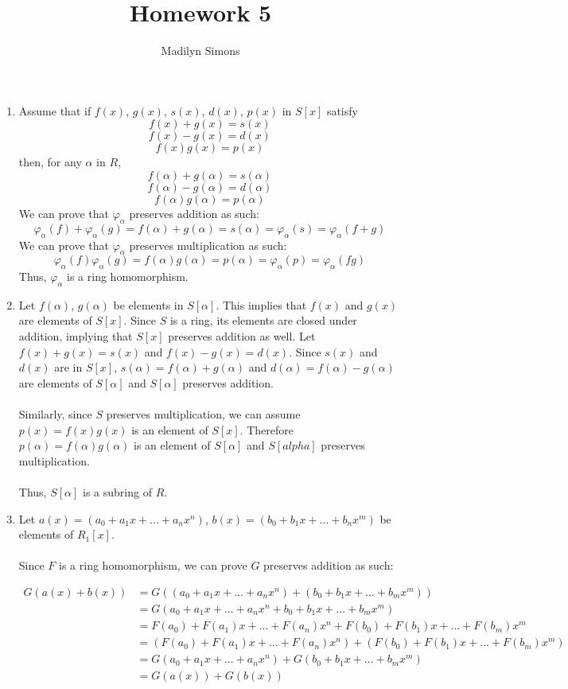 \documentclass{article}
\title{Homework 5}
\author{Madilyn Simons}
\date{}
\begin{document}
\maketitle

\begin{enumerate}

\item Assume that if $f(x)$, $g(x)$, $s(x)$, $d(x)$, $p(x)$ in $S[x]$ satisfy
\[
f(x) + g(x) = s(x)
\] \[
f(x) - g(x) = d(x)
\] \[
f(x)g(x) = p(x)
\]
then, for any $\alpha$ in $R$,
\[
\] \[
f(\alpha) + g(\alpha) = s(\alpha)
\] \[
f(\alpha) - g(\alpha) = d(\alpha)
\] \[
f(\alpha)g(\alpha) = p(\alpha)
\]
We can prove that $\varphi_{\alpha}$ preserves addition as such:
\[
\varphi_{\alpha}(f) + \varphi_{\alpha}(g) = f(\alpha) + g(\alpha) = s(\alpha) = \varphi_{\alpha}(s) = \varphi_{\alpha}(f+g)
\]
We can prove that $\varphi_{\alpha}$ preserves multiplication as such:
\[
\varphi_{\alpha}(f)\varphi_{\alpha}(g) = f(\alpha)g(\alpha) = p(\alpha) = \varphi_{\alpha}(p) = \varphi_{\alpha}(fg)
\]
Thus, $\varphi_{\alpha}$ is a ring homomorphism.

\item Let $f(\alpha)$, $g(\alpha)$ be elements in $S[\alpha]$.  This implies
that $f(x)$ and $g(x)$ are elements of $S[x]$.  Since $S$ is a ring, its
elements are closed under addition, implying that $S[x]$ preserves
addition as well.  Let $f(x) + g(x) = s(x)$ and $f(x) - g(x) = d(x)$.  Since
$s(x)$ and $d(x)$ are in $S[x]$, $s(\alpha) = f(\alpha) + g(\alpha)$ and
$d(\alpha) = f(\alpha) - g(\alpha)$ are elements of $S[\alpha]$ and $S[\alpha]$
preserves addition.
\\
\\
Similarly, since $S$ preserves multiplication, we can assume $p(x) = f(x)g(x)$
is an element of $S[x]$.  Therefore $p(\alpha) = f(\alpha)g(\alpha)$ is an
element of $S[\alpha]$ and $S[alpha]$ preserves multiplication.
\\
\\
Thus, $S[\alpha]$ is a subring of $R$.




\item Let $a(x) = (a_0 + a_{1}x + ... + a_{n}x^n)$, $b(x) = (b_0 + b_{1}x + ... + b_{n}x^m)$
be elements of $R_{1}[x]$.
\\ \\
Since $F$ is a ring homomorphism, we can prove $G$ preserves addition as such:

\begin{align*}
G(a(x) + b(x)) &= G((a_0 + a_{1}x + ... + a_{n}x^{n}) + (b_0 + b_{1}x + ... + b_{m}x^{m})) \\
&= G(a_0 + a_{1}x + ... + a_{n}x^n + b_0 + b_{1}x + ... + b_{m}x^{m}) \\
&= F(a_{0}) + F(a_{1})x + ... + F(a_{n})x^{n} + F(b_{0}) + F(b_{1})x + ... + F(b_{m})x^{m} \\
&= (F(a_{0}) + F(a_{1})x + ... + F(a_{n})x^{n}) + (F(b_{0}) + F(b_{1})x + ... + F(b_{m})x^{m}) \\
&= G(a_0 + a_{1}x + ... + a_{n}x^{n}) + G(b_0 + b_{1}x + ... + b_{m}x^{m}) \\
&= G(a(x)) + G(b(x))
\end{align*}


\end{enumerate}
\end{document}
